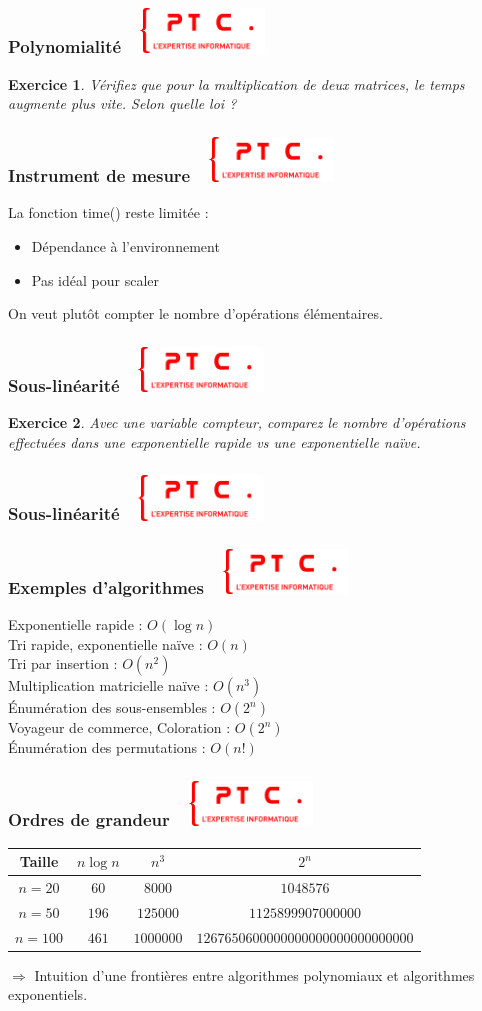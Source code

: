 \documentclass[11pt]{beamer}
\newenvironment{slide}[1]{%
\begin{frame}[environment=slide]
\frametitle{#1~\hfill~\includegraphics[height=1.2cm]{./epitech.png}}
}{%
\end{frame}
}
\newtheorem{exercice}{Exercice}
\newcommand{\Python}[1]{
	{\small	}
}
\begin{document}
\begin{slide}{Polynomialité}
\begin{exercice}
Vérifiez que pour la multiplication de deux matrices, le temps augmente plus vite. Selon quelle loi ?\\
\end{exercice}
\end{slide}

\begin{slide}{Instrument de mesure}
La fonction time() reste limitée :
\begin{itemize}
	\item Dépendance à l'environnement
	\item Pas idéal pour scaler
\end{itemize}
\pause
On veut plutôt compter le nombre d'opérations élémentaires.
\end{slide}

\begin{slide}{Sous-linéarité}
\begin{exercice}
Avec une variable compteur, comparez le nombre d'opérations effectuées dans une exponentielle rapide vs une exponentielle naïve.
\end{exercice}
\end{slide}

\begin{slide}{Sous-linéarité}
\Python{countexp}
\end{slide}


\begin{slide}{Exemples d'algorithmes}

Exponentielle rapide : $O(\log n)$\\
Tri rapide, exponentielle naïve : $O(n)$\\
Tri par insertion : $O(n^2)$\\
Multiplication matricielle naïve : $O(n^3)$\\
{\'E}numération des sous-ensembles : $O(2^n)$\\
Voyageur de commerce, Coloration : $O(2^n)$\\
{\'E}numération des permutations : $O(n!)$

\end{slide}

\begin{slide}{Ordres de grandeur}
\begin{center}
\begin{tabular}{c|c|c|c}
Taille  & $n\log n$ & $n^3$ & $2^n$ \\
\hline
$n=20$ & $60$ & $8 000$ & $1 048 576$ \\
$n=50$ & $196$ & $125 000$ & $1 125 899 907 000 000$ \\
$n=100$ & $461$ & $1 000 000$ & $1 267 650 600 000 000 000 000 000 000 000$\\
\end{tabular}
\end{center}

$\Longrightarrow$ Intuition d'une frontières entre algorithmes polynomiaux et algorithmes exponentiels.

\end{slide}
\end{document}

